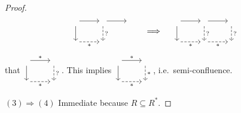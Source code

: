 \begin{proof}
\[\begin{tikzcd}[ampersand replacement=\&]
{} \arrow[r] \arrow[d] \& {} \arrow[d, dashed, "{?}"] \arrow[r] \& {}  \\
{} \arrow[r, swap, dashed, "{*}"] \& {} \& {}
\end{tikzcd} \quad\implies\quad \begin{tikzcd}[ampersand replacement=\&]
{} \arrow[r] \arrow[d] \& {} \arrow[d, dashed, "{?}"] \arrow[r] \& {} \arrow[d, dashed, "{?}"] \\
{} \arrow[r, swap, dashed, "{*}"] \& {} \arrow[r, swap, dashed, "{*}"] \& {}
\end{tikzcd} \]
that $\begin{tikzcd}
{} \arrow[r, "{*}"] \arrow[d] & {} \arrow[d, dashed, "{?}"] \\
{} \arrow[r, swap, dashed, "{*}"] & {}
\end{tikzcd}$. This implies $\begin{tikzcd}
{} \arrow[r, "{*}"] \arrow[d] & {} \arrow[d, dashed, "{*}"] \\
{} \arrow[r, swap, dashed, "{*}"] & {}
\end{tikzcd}$, i.e.\ semi-confluence.

$(3) \Rightarrow (4)$ Immediate because $R\subseteq R^*$.
\end{proof}

